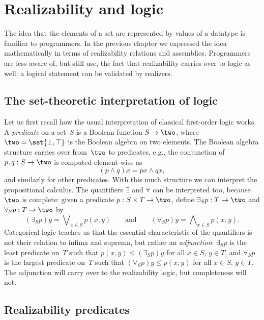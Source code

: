 \chapter{Realizability and logic}
\label{cha:realizability-logic}

The idea that the elements of a set are represented by values of a datatype is familiar to programmers. In the previous chapter we expressed the idea mathematically in terms of realizability relations and assemblies. Programmers are less aware of, but still use, the fact that realizability carries over to logic as well: a logical statement can be validated by realizers.

\section{The set-theoretic interpretation of logic}
\label{sec:interpr-logic-set-theoretic}

Let us first recall how the usual interpretation of classical
first-order logic works.
%
A \emph{predicate} on a set~$S$ is a Boolean function $S \to \two$, where $\two = \set{\bot, \top}$ is the Boolean algebra on two elements. The Boolean algebra structure carries over from~$\two$ to predicates, e.g., the conjunction of $p, q : S \to \two$ is computed element-wise as
%
\begin{equation*}
  (p \land q) x = p x \land q x,
\end{equation*}
%
and similarly for other predicates. With this much structure we can interpret the propositional calculus. The quantifiers $\exists$ and $\forall$ can be interpreted too, because~$\two$ is complete: given a predicate $p : S \times T \to \two$, define $\exists_S p : T \to \two$ and $\forall_S p : T \to \two$ by
%
\begin{equation*}
  (\exists_S p) y = \bigvee\nolimits_{x \in S} p(x, y)
  \qquad\text{and}\qquad
  (\forall_S p) y = \bigwedge\nolimits_{x \in S} p(x, y).
\end{equation*}
%
Categorical logic teaches us that the essential characteristic of the quantifiers is not their relation to infima and suprema, but rather an \emph{adjunction}: $\exists_S p$ is the least predicate on~$T$ such that $p(x, y) \leq (\exists_S p) y$ for all $x \in S$, $y \in T$, and $\forall_S p$ is the largest predicate on~$T$ such that $(\forall_S p) y \leq p(x, y)$ for all $x \in S$, $y \in T$. The adjunction will carry over to the realizability logic, but completeness will not.


\section{Realizability predicates}
\label{sec:realizability-predicates}


